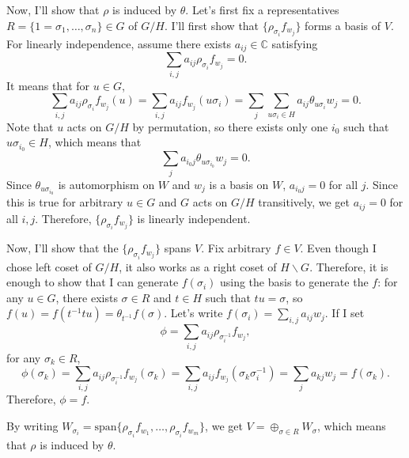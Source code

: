 \documentclass[a4paper, 12pt]{article}
\theoremstyle{Mydefinition}
\theoremstyle{Mytheorem}
\begin{document}
Now, I'll show that $\rho$ is induced by $\theta$. Let's first fix a representatives $R=\{1=\sigma_1, \ldots, \sigma_n\}\in G$ of $G/H$. I'll first show that $\{\rho_{\sigma_i}f_{w_j}\}$ forms a basis of $V$. For linearly independence, assume there exists $a_{ij}\in\mathbb{C}$ satisfying
\begin{equation}
    \sum_{i,j}a_{ij}\rho_{\sigma_i} f_{w_j} = 0.
\end{equation}
It means that for $u\in G$,
\begin{equation}
    \sum_{i,j}a_{ij}\rho_{\sigma_i} f_{w_j}(u) = \sum_{i,j}a_{ij} f_{w_j}(u\sigma_i) = \sum_j\sum_{u\sigma_i\in H}a_{ij} \theta_{u\sigma_i}w_j = 0.
\end{equation}
Note that $u$ acts on $G/H$ by permutation, so there exists only one $i_0$ such that $u\sigma_{i_0}\in H$, which means that
\begin{equation}
    \sum_ja_{i_0j} \theta_{u\sigma_{i_0}}w_j = 0.
\end{equation}
Since $\theta_{u\sigma_{i_0}}$ is automorphism on $W$ and $w_j$ is a basis on $W$, $a_{i_0j} = 0$ for all $j$. Since this is true for arbitrary $u\in G$ and $G$ acts on $G/H$ transitively, we get $a_{ij}=0$ for all $i,j$. Therefore, $\{\rho_{\sigma_i}f_{w_j}\}$ is linearly independent.

Now, I'll show that the $\{\rho_{\sigma_i}f_{w_j}\}$ spans $V$. Fix arbitrary $f\in V$. Even though I chose left coset of $G/H$, it also works as a right coset of $H\backslash G$. Therefore, it is enough to show that I can generate $f(\sigma_i)$ using the basis to generate the $f$: for any $u\in G$, there exists $\sigma\in R$ and $t\in H$ such that $tu=\sigma$, so $f(u) = f(t^{-1}tu) = \theta_{t^{-1}}f(\sigma)$. Let's write $f(\sigma_i) = \sum_{i,j}a_{ij}w_j$. If I set
\begin{equation}
    \phi = \sum_{i,j}a_{ij}\rho_{\sigma^{-1}_i}f_{w_j},
\end{equation}
for any $\sigma_k\in R$,
\begin{equation}
    \phi(\sigma_k) = \sum_{i,j}a_{ij}\rho_{\sigma^{-1}_i}f_{w_j}(\sigma_k) = \sum_{i,j}a_{ij}f_{w_j}(\sigma_k\sigma^{-1}_i) = \sum_j a_{kj}w_j = f(\sigma_k).
\end{equation}
Therefore, $\phi=f$. 

By writing $W_{\sigma_i} = \mathrm{span}\{\rho_{\sigma_i}f_{w_1}, \ldots, \rho_{\sigma_i}f_{w_m}\}$, we get $V = \oplus_{\sigma\in R}W_\sigma$, which means that $\rho$ is induced by $\theta$.\\
\end{document}
